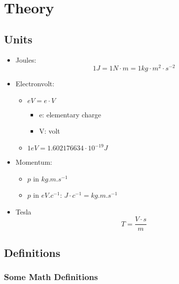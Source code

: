 \chapter{Theory}

\section{Units}\label{units}

\begin{itemize}
\item
  Joules: \[1 J = 1 N \cdot m = 1 kg \cdot m^2 \cdot s^{-2}\]
\item
  Electronvolt:

  \begin{itemize}
  \tightlist
  \item
    \(eV = e \cdot V\)

    \begin{itemize}
    \tightlist
    \item
      e: elementary charge
    \item
      V: volt
    \end{itemize}
  \item
    \(1 eV = 1.602176634 \cdot 10^{-19} J\)
  \end{itemize}
\item
  Momentum:

  \begin{itemize}
  \tightlist
  \item
    \(p\) in \(kg.m.s^{-1}\)
  \item
    \(p\) in \(eV.c^{-1}\): \(J \cdot c^{-1} = kg.m.s^{-1}\)
  \end{itemize}
\item
  Tesla \[T = \frac{V \cdot s}{m}\]
\end{itemize}

\newpage

\hypertarget{definitions}{%
\section{Definitions}\label{definitions}}

\hypertarget{some-math-definitions}{%
\subsection{Some Math Definitions}\label{some-math-definitions}}

